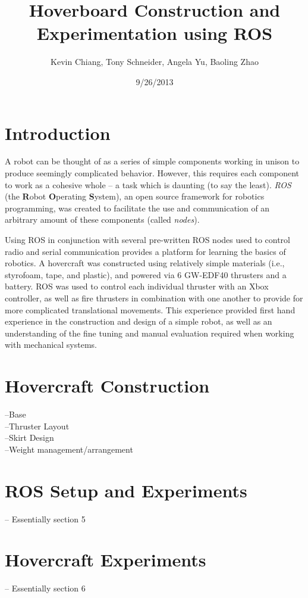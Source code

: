 \documentclass[9pt]{article}
\title{Hoverboard Construction and Experimentation using ROS}
\author{Kevin Chiang, Tony Schneider, Angela Yu, Baoling Zhao}
\date{9/26/2013}
\begin{document}
\maketitle

\section*{Introduction}
A robot can be thought of as a series of simple components working in unison to produce seemingly complicated behavior.  However, this requires each component to work as a cohesive whole -- a task which is daunting (to say the least). \emph {ROS} (the \textbf{R}obot \textbf{O}perating \textbf{S}ystem), an open source framework for robotics programming, was created to facilitate the use and communication of an arbitrary amount of these components (called \emph{nodes}). 

Using ROS in conjunction with several pre-written ROS nodes used to control radio and serial communication provides a platform for learning the basics of robotics. A hovercraft was constructed using relatively simple materials (i.e., styrofoam, tape, and plastic), and powered via 6 GW-EDF40 thrusters and a battery.  ROS was used to control each individual thruster with an Xbox controller, as well as fire thrusters in combination with one another to provide for more complicated translational movements.  This experience provided first hand experience in the construction and design of a simple robot, as well as an understanding of the fine tuning and manual evaluation required when working with mechanical systems.

\section*{Hovercraft Construction}
--Base\\
--Thruster Layout\\
--Skirt Design\\
--Weight management/arrangement\\

\section*{ROS Setup and Experiments}
--  Essentially section 5

\section*{Hovercraft Experiments}
-- Essentially section 6
\end{document}
